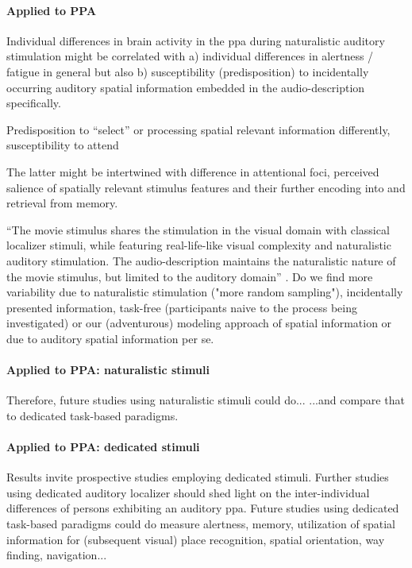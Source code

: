 \paragraph{Applied to PPA}


%
Individual differences in brain activity in the \ac{ppa} during naturalistic
auditory stimulation might be correlated with
%
a) individual differences in alertness / fatigue in general but also
%
b) susceptibility (predisposition) to incidentally occurring auditory spatial
information embedded in the audio-description specifically.

Predisposition to ``select'' or processing spatial relevant information
differently, susceptibility to attend

%
The latter might be intertwined with difference in attentional foci, perceived
salience of spatially relevant stimulus features and their further encoding into
and retrieval from memory.



%
``The movie stimulus shares the stimulation in the visual domain with classical
localizer stimuli, while featuring real-life-like visual complexity and
naturalistic auditory stimulation.
%
The audio-description maintains the naturalistic nature of the movie stimulus,
but limited to the auditory domain'' \citep{haeusler2022processing}.
%
Do we find more variability due to naturalistic stimulation ("more random
sampling"), incidentally presented information, task-free (participants naive to
the process being investigated) or our (adventurous) modeling approach of
spatial information or due to auditory spatial information per se.


\paragraph{Applied to PPA: naturalistic stimuli}
%
Therefore, future studies using naturalistic stimuli could do...
%
...and compare that to dedicated task-based paradigms.



\paragraph{Applied to PPA: dedicated stimuli}

%
Results invite prospective studies employing dedicated stimuli.
%
Further studies using dedicated auditory localizer should shed light on the
inter-individual differences of persons exhibiting an auditory \ac{ppa}.
%
Future studies using dedicated task-based paradigms could do measure alertness,
memory, utilization of spatial information for (subsequent visual) place
recognition, spatial orientation, way finding, navigation...

